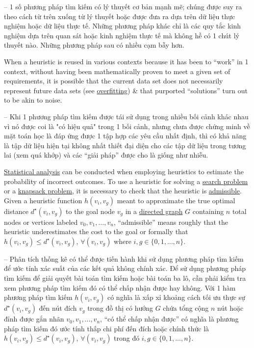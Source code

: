 \documentclass{article}
\begin{document}
-- 1 số phương pháp tìm kiếm có lý thuyết cơ bản mạnh mẽ; chúng được suy ra theo cách từ trên xuống từ lý thuyết hoặc được đưa ra dựa trên dữ liệu thực nghiệm hoặc dữ liệu thực tế. Những phương pháp khác chỉ là các quy tắc kinh nghiệm dựa trên quan sát hoặc kinh nghiệm thực tế mà không hề có 1 chút lý thuyết nào. Những phương pháp sau có nhiều cạm bẫy hơn.

When a heuristic is reused in various contexts because it has been to ``work'' in 1 context, without having been mathematically proven to meet a given set of requirements, it is possible that the current data set does not necessarily represent future data sets (see \href{https://en.wikipedia.org/wiki/Overfitting}{overfitting}) \& that purported ``solutions'' turn out to be akin to noise.

-- Khi 1 phương pháp tìm kiếm được tái sử dụng trong nhiều bối cảnh khác nhau vì nó được coi là "có hiệu quả" trong 1 bối cảnh, nhưng chưa được chứng minh về mặt toán học là đáp ứng được 1 tập hợp các yêu cầu nhất định, thì có khả năng là tập dữ liệu hiện tại không nhất thiết đại diện cho các tập dữ liệu trong tương lai (xem quá khớp) và các ``giải pháp'' được cho là giống như nhiễu.

\href{https://en.wikipedia.org/wiki/Statistical_analysis}{Statistical analysis} can be conducted when employing heuristics to estimate the probability of incorrect outcomes. To use a heuristic for solving a \href{https://en.wikipedia.org/wiki/Search_problem}{search problem} or a \href{https://en.wikipedia.org/wiki/Knapsack_problem}{knapsack problem}, it is necessary to check that the heuristic is \href{https://en.wikipedia.org/wiki/Admissible_heuristic}{admissible}. Given a heuristic function $h(v_i,v_g)$ meant to approximate the true optimal distance $d^\star(v_i,v_g)$ to the goal node $v_g$ in a \href{https://en.wikipedia.org/wiki/Directed_graph}{directed graph} $G$ containing $n$ total nodes or vertices labeled $v_0,v_1,\ldots,v_n$, ``admissible'' means roughly that the heuristic underestimates the cost to the goal or formally that $h(v_i,v_g)\le d^\star(v_i,v_g)$, $\forall(v_i,v_g)$ where $i,g\in\{0,1,\ldots,n\}$.

-- Phân tích thống kê có thể được tiến hành khi sử dụng phương pháp tìm kiếm để ước tính xác suất của các kết quả không chính xác. Để sử dụng phương pháp tìm kiếm để giải quyết bài toán tìm kiếm hoặc bài toán ba lô, cần phải kiểm tra xem phương pháp tìm kiếm đó có thể chấp nhận được hay không. Với 1 hàm phương pháp tìm kiếm $h(v_i,v_g)$ có nghĩa là xấp xỉ khoảng cách tối ưu thực sự $d^\star(v_i,v_g)$ đến nút đích $v_g$ trong đồ thị có hướng $G$ chứa tổng cộng $n$ nút hoặc đỉnh được gắn nhãn $v_0,v_1,\ldots,v_n$, ``có thể chấp nhận được'' có nghĩa là phương pháp tìm kiếm đó ước tính thấp chi phí đến đích hoặc chính thức là $h(v_i,v_g)\le d^\star(v_i,v_g)$, $\forall(v_i,v_g)$ trong đó $i,g\in\{0,1,\ldots,n\}$.
\end{document}
